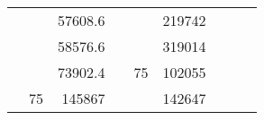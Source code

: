 \begin{table}[H]
\begin{tabular}{|ccrccrccc}
\multicolumn{1}{|c|}{\cellcolor[HTML]{FFFFC7}}                                & \multicolumn{1}{c|}{\cellcolor[HTML]{DAE8FC}}                      & \multicolumn{1}{r|}{\cellcolor[HTML]{DAE8FC}57608.6}   & \multicolumn{1}{c|}{\cellcolor[HTML]{FFFFC7}}                                & \multicolumn{1}{c|}{\cellcolor[HTML]{DAE8FC}}                       & \multicolumn{1}{r|}{\cellcolor[HTML]{DDFDFF}219742}    &                                                                              &                                                                    &                                                        \\ \cline{3-3} \cline{6-6}
\multicolumn{1}{|c|}{\cellcolor[HTML]{FFFFC7}}                                & \multicolumn{1}{c|}{\cellcolor[HTML]{DAE8FC}}                      & \multicolumn{1}{r|}{\cellcolor[HTML]{DDFDFF}58576.6}   & \multicolumn{1}{c|}{\cellcolor[HTML]{FFFFC7}}                                & \multicolumn{1}{c|}{\cellcolor[HTML]{DAE8FC}}                       & \multicolumn{1}{r|}{\cellcolor[HTML]{DAE8FC}319014}    &                                                                              &                                                                    &                                                        \\ \cline{3-3} \cline{6-6}
\multicolumn{1}{|c|}{\cellcolor[HTML]{FFFFC7}}                                & \multicolumn{1}{c|}{\cellcolor[HTML]{DAE8FC}}                      & \multicolumn{1}{r|}{\cellcolor[HTML]{DAE8FC}73902.4}   & \multicolumn{1}{c|}{\cellcolor[HTML]{FFFFC7}}                                & \multicolumn{1}{c|}{\multirow{-10}{*}{\cellcolor[HTML]{DAE8FC}75}}  & \multicolumn{1}{r|}{\cellcolor[HTML]{DDFDFF}102055}    &                                                                              &                                                                    &                                                        \\ \cline{3-3} \cline{5-6}
\multicolumn{1}{|c|}{\cellcolor[HTML]{FFFFC7}}                                & \multicolumn{1}{c|}{\multirow{-10}{*}{\cellcolor[HTML]{DAE8FC}75}} & \multicolumn{1}{r|}{\cellcolor[HTML]{DDFDFF}145867}    & \multicolumn{1}{c|}{\cellcolor[HTML]{FFFFC7}}                                & \multicolumn{1}{c|}{\cellcolor[HTML]{DDFDFF}}                       & \multicolumn{1}{r|}{\cellcolor[HTML]{DAE8FC}142647}    &                                                                              &                                                                    &                                                        \\ \cline{2-3} \cline{6-6}

\end{tabular}
\end{table}

